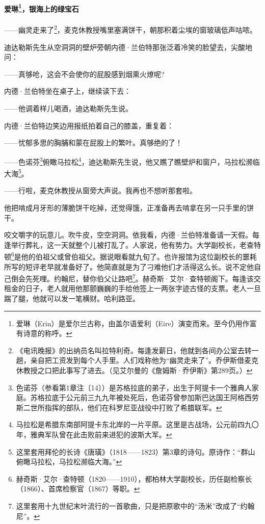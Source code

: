 \paragraph*{爱琳\footnote{爱琳（Erin）是爱尔兰古称，由盖尔语爱利（Eire）演变而来。至今仍用作富有诗意的称呼。}，银海上的绿宝石}
\par ——幽灵走来了\footnote{《电讯晚报》的出纳员名叫拉特利奇。每逢发薪日，他就到各间办公室去转一趟，亲自把工资发到每个人手里。人们戏称他为“幽灵走来了”。乔伊斯借麦克休教授之口把此事写了进去。（见艾尔曼的《詹姆斯·乔伊斯》第289页。）}，麦克休教授嘴里塞满饼干，朝那积着尘埃的窗玻璃低声咕哝。
\par 迪达勒斯先生从空洞洞的壁炉旁朝内德·兰伯特那张泛着冷笑的脸望去，尖酸地问：
\par ——真够呛，这会不会使你的屁股感到烟熏火燎呢?
\par 内德·兰伯特坐在桌子上，继续读下去：
\par ——他调着样儿喝酒，迪达勒斯先生说。
\par 内德·兰伯特边笑边用报纸拍着自己的膝盖，重复着：
\par ——忧郁多思的胸脯和蒙在屁股上的繁叶。真够绝的了！
\par ——色诺芬\footnote{色诺芬（参看第1章注〔14〕）是苏格拉底的弟子，出生于阿提卡一个雅典人家庭。苏格拉底于公元前三九九年被处死后，色诺芬曾参加斯巴达国王阿格西劳斯二世所指挥的部队，他们在科罗尼亚战役中打败了希腊联军。}俯瞰马拉松\footnote{马拉松是希腊东南部阿提卡东北岸的一片平原。这里是古战场，公元前四九〇年，雅典军队曾在此击败前来进犯的波斯大军。}，迪达勒斯先生说，他又瞧了瞧壁炉和窗户，马拉松濒临大海\footnote{这里套用拜伦的长诗《唐璜》（1818——1823）第3章的诗句。原诗作：“群山俯瞰马拉松，马拉松濒临大海。”}。
\par ——行啦，麦克休教授从窗旁大声说。我再也不想听那套啦。
\par 他把啃成月牙形的薄脆饼干吃掉，还觉得饿，正准备再去啃拿在另一只手里的饼干。
\par 咬文嚼字的玩意儿。吹牛皮，空空洞洞。依我看，内德·兰伯特准备请一天假。每逢举行葬礼，这一天就整个儿被打乱了。人家说，他有势力。大学副校长，老查特顿\footnote{赫奇斯·艾尔·查特顿（1820——1910），都柏林大学副校长，历任副检察长（1866）、首席检察官（1867）等职。}是他的伯祖父或曾伯祖父。据说眼看就九旬了。也许报馆为这位副校长的噩耗所写的短评老早就准备好了。他简直就是为了刁难他们才活得这么长。说不定他自己倒会先死哩。约翰尼，替你伯父让路吧\footnote{这里套用十九世纪末叶流行的一首歌曲，只是把原歌中的“汤米”改成了“约翰尼”。}。赫奇斯·艾尔·查特顿阁下。每逢该交租金的日子，老人就用他那颤巍巍的手给他签上一两张字迹古怪的支票。老人一旦踹了腿，他就可以发一笔横财。哈利路亚。
